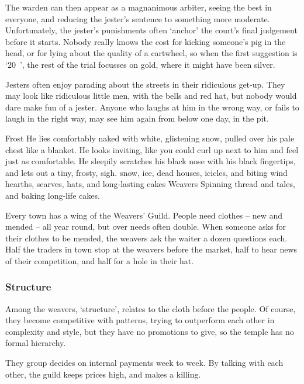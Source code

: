 \begin{multicols}{2}
The warden can then appear as a magnanimous arbiter, seeing the best in everyone, and reducing the jester's sentence to something more moderate.
Unfortunately, the jester's punishments often `anchor' the court's final judgement before it starts.
Nobody really knows the cost for kicking someone's pig in the head, or for lying about the quality of a cartwheel, so when the first suggestion is `20~', the rest of the trial focusses on gold, where it might have been silver.

Jesters often enjoy parading about the streets in their ridiculous get-up.
They may look like ridiculous little men, with the bells and red hat, but nobody would dare make fun of a jester.
Anyone who laughs at him in the wrong way, or fails to laugh in the right way, may see him again from below one day, in the pit.

  {\hexstar}%
  {Frost}%
  {
    He lies comfortably naked with white, glistening snow, pulled over his pale chest like a blanket.
    He looks inviting, like you could curl up next to him and feel just as comfortable.
    He sleepily scratches his black nose with his black fingertips, and lets out a tiny, frosty, {\sffamily sigh}.
  }%
  {snow, ice, dead houses, icicles, and biting wind}%
  {hearths, scarves, hats, and long-lasting cakes}%
  {Weavers}%
  {
    Spinning thread and tales, and baking long-life cakes.
  }%

Every town has a wing of the Weavers' Guild.
People need clothes -- new and mended -- all year round, but over needs often double.
When someone asks for their clothes to be mended, the weavers ask the waiter a dozen questions each.
Half the traders in town stop at the weavers before the market, half to hear news of their competition, and half for a hole in their hat.

\subsubsection{Structure}

Among the weavers, `structure', relates to the cloth before the people.
Of course, they become competitive with patterns, trying to outperform each other in complexity and style, but they have no promotions to give, so the temple has no formal hierarchy.

They group decides on internal payments week to week.
By talking with each other, the guild keeps prices high, and makes a killing.


\end{multicols}
